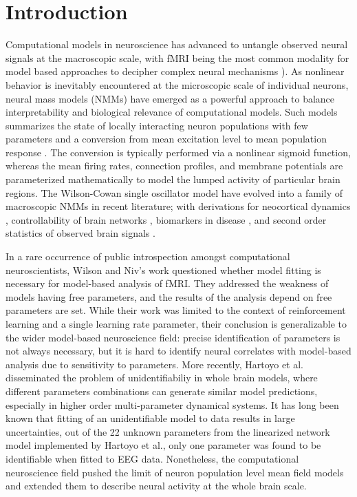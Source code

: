 \section{Introduction}
Computational models in neuroscience has advanced to untangle observed neural signals at the macroscopic scale, with fMRI being the most common modality for model based approaches to decipher complex neural mechanisms \cite{wilson_is_2015}). As nonlinear behavior is inevitably encountered at the microscopic scale of individual neurons, neural mass models (NMMs) have emerged as a powerful approach to balance interpretability and biological relevance of computational models. Such models summarizes the state of locally interacting neuron populations with few parameters and a conversion from mean excitation level to mean population response \cite{freeman_tutorial_1992}. The conversion is typically performed via a nonlinear sigmoid function, whereas the mean firing rates, connection profiles, and membrane potentials are parameterized mathematically to model the lumped activity of particular brain regions\cite{LopesdaSilva1974, robinson_prediction_2001, Valdes1999}. The Wilson-Cowan single oscillator model \cite{Wilson1972} have evolved into a family of macroscopic NMMs in recent literature; with derivations for neocortical dynamics \cite{cowan_wilsoncowan_2016}, controllability of brain networks \cite{muldoon_stimulation-based_2016}, biomarkers in disease \cite{Zimmermann2018}, and second order statistics of observed brain signals \cite{Deco2009, abeysuriya_biophysical_2018, singh_estimation_2020, byrne_next-generation_2019, wang_inversion_2019}.

In a rare occurrence of public introspection amongst computational neuroscientists, Wilson and Niv's work \cite{wilson_is_2015} questioned whether model fitting is necessary for model-based analysis of fMRI. They addressed the weakness of models having free parameters, and the results of the analysis depend on free parameters are set. While their work was limited to the context of reinforcement learning and a single learning rate parameter, their conclusion is generalizable to the wider model-based neuroscience field: precise identification of parameters is not always necessary, but it is hard to identify neural correlates with model-based analysis due to sensitivity to parameters. More recently, Hartoyo et al. \cite{hartoyo_parameter_2019} disseminated the problem of unidentifiabiliy in whole brain models, where different parameters combinations can generate similar model predictions, especially in higher order multi-parameter dynamical systems. It has long been known that fitting of an unidentifiable model to data results in large uncertainties, out of the 22 unknown parameters from the linearized network model implemented by Hartoyo et al., only one parameter was found to be identifiable when fitted to EEG data. Nonetheless, the computational neuroscience field pushed the limit of neuron population level mean field models and extended them to describe neural activity at the whole brain scale.

